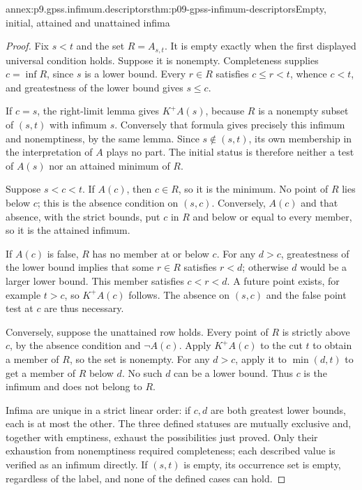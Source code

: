 \begin{annexitem}{annex:p9.gpss.infimum.descriptors}{thm:p09-gpss-infimum-descriptors}{Empty, initial, attained and unattained infima}
\begin{proof}
Fix \(s<t\) and the set \(R=A_{s,t}\). It is empty exactly
when the first displayed universal condition holds. Suppose
it is nonempty. Completeness supplies \(c=\inf R\), since
\(s\) is a lower bound. Every \(r\in R\) satisfies
\(c\leq r<t\), whence \(c<t\), and greatestness of the
lower bound gives \(s\leq c\).

If \(c=s\), the right-limit lemma gives \(K^+A(s)\),
because \(R\) is a nonempty subset of \((s,t)\) with
infimum \(s\). Conversely that formula gives precisely
this infimum and nonemptiness, by the same lemma. Since
\(s\notin(s,t)\), its own membership in the interpretation
of \(A\) plays no part. The initial status is therefore
neither a test of \(A(s)\) nor an attained minimum of \(R\).

Suppose \(s<c<t\). If \(A(c)\), then \(c\in R\), so
it is the minimum. No point of \(R\) lies below \(c\);
this is the absence condition on \((s,c)\). Conversely,
\(A(c)\) and that absence, with the strict bounds, put
\(c\) in \(R\) and below or equal to every member, so
it is the attained infimum.

If \(A(c)\) is false, \(R\) has no member at or below
\(c\). For any \(d>c\), greatestness of the lower bound
implies that some \(r\in R\) satisfies \(r<d\);
otherwise \(d\) would be a larger lower bound. This
member satisfies \(c<r<d\). A future point exists,
for example \(t>c\), so \(K^+A(c)\) follows.
The absence on \((s,c)\) and the false point test at
\(c\) are thus necessary.

Conversely, suppose the unattained row holds. Every point
of \(R\) is strictly above \(c\), by the absence
condition and \(\neg A(c)\). Apply \(K^+A(c)\) to
the cut \(t\) to obtain a member of \(R\), so the set
is nonempty. For any \(d>c\), apply it to \(\min(d,t)\)
to get a member of \(R\) below \(d\). No such \(d\)
can be a lower bound. Thus \(c\) is the infimum and
does not belong to \(R\).

Infima are unique in a strict linear order: if \(c,d\)
are both greatest lower bounds, each is at most the other.
The three defined statuses are mutually exclusive and,
together with emptiness, exhaust the possibilities just proved.
Only their exhaustion from nonemptiness required completeness;
each described value is verified as an infimum directly.
If \((s,t)\) is empty, its occurrence set is empty,
regardless of the label, and none of the defined cases can hold.


\end{proof}
\end{annexitem}
